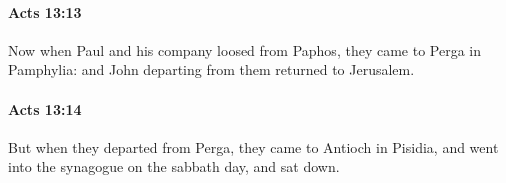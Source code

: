 		\paragraph{Acts 13:13} %
			\label{ACTS-13-13}

			Now when Paul and his company loosed from Paphos, they came to Perga in Pamphylia: and John departing from them returned to Jerusalem.

			\begin{framed}
			\scriptsize
				\begin{compactdesc}
					\item[SBLG] 
				\end{compactdesc}
			\end{framed}

		\paragraph{Acts 13:14} %
			\label{ACTS-13-14}

			But when they departed from Perga, they came to Antioch in Pisidia, and went into the synagogue on the sabbath day, and sat down.

